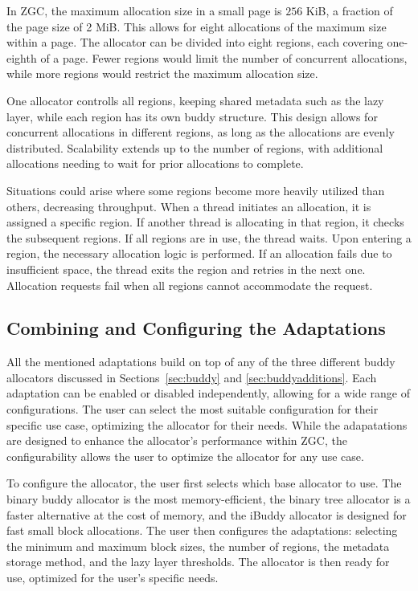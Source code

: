 In ZGC, the maximum allocation size in a small page is $256$ KiB, a fraction of the page size of 2 MiB. This allows for eight allocations of the maximum size within a page. The allocator can be divided into eight regions, each covering one-eighth of a page. Fewer regions would limit the number of concurrent allocations, while more regions would restrict the maximum allocation size.

One allocator controlls all regions, keeping shared metadata such as the lazy layer, while each region has its own buddy structure. This design allows for concurrent allocations in different regions, as long as the allocations are evenly distributed. Scalability extends up to the number of regions, with additional allocations needing to wait for prior allocations to complete.

Situations could arise where some regions become more heavily utilized than others, decreasing throughput. When a thread initiates an allocation, it is assigned a specific region. If another thread is allocating in that region, it checks the subsequent regions. If all regions are in use, the thread waits. Upon entering a region, the necessary allocation logic is performed. If an allocation fails due to insufficient space, the thread exits the region and retries in the next one. Allocation requests fail when all regions cannot accommodate the request.

\subsection{Combining and Configuring the Adaptations} \label{sec:adaptationsall}
All the mentioned adaptations build on top of any of the three different buddy allocators discussed in Sections~\ref{sec:buddy} and \ref{sec:buddyadditions}. Each adaptation can be enabled or disabled independently, allowing for a wide range of configurations. The user can select the most suitable configuration for their specific use case, optimizing the allocator for their needs. While the adapatations are designed to enhance the allocator's performance within ZGC, the configurability allows the user to optimize the allocator for any use case.

To configure the allocator, the user first selects which base allocator to use. The binary buddy allocator is the most memory-efficient, the binary tree allocator is a faster alternative at the cost of memory, and the iBuddy allocator is designed for fast small block allocations. The user then configures the adaptations: selecting the minimum and maximum block sizes, the number of regions, the metadata storage method, and the lazy layer thresholds. The allocator is then ready for use, optimized for the user's specific needs.
